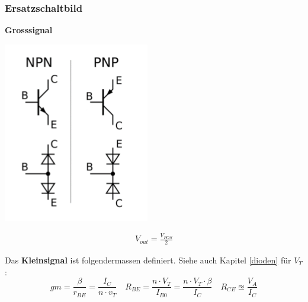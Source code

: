 \subsubsection{Ersatzschaltbild}
\noindent\textbf{Grosssignal}\\
\begin{minipage}{0.20\textwidth}
	\includegraphics[width=\linewidth,keepaspectratio=true]{./Images/transitor_kleinsignal}
\end{minipage}%
\begin{minipage}{0.30\textwidth}
	\begin{align*}
		V_{out} = \frac{V_{POS}}{2}
	\end{align*}
\end{minipage}

\noindent Das \textbf{Kleinsignal} ist folgendermassen definiert. Siehe auch Kapitel \ref{dioden} für $V_T$: 
\[
gm = \frac{\beta}{r_{BE}} = \frac{I_C}{n\cdot v_T} \quad R_{BE} = \frac{n\cdot V_T}{I_{B0}} = \frac{n\cdot V_T \cdot \beta}{I_C} \quad R_{CE} \approxeq \frac{V_A}{I_C}
\]

